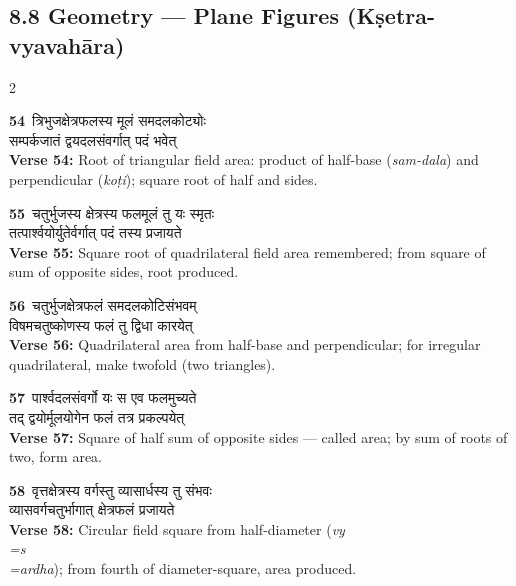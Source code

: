 \documentclass[11pt,a4paper]{article}
\newcommand{\dev}[1]{{\devanagarifont #1}}
\newcommand{\iast}[1]{\textit{#1}}
\newcommand{\vnum}[1]{\textcolor{versenumbercolor}{\textbf{#1}}}
\begin{document}
\subsection*{8.8 Geometry --- Plane Figures (K\d setra-vyavah\=ara)}
\label{sec:8.8}

\begin{center}
\end{center}

\begin{paracol}{2}

\switchcolumn[0]
\vnum{54}\ \dev{त्रिभुजक्षेत्रफलस्य मूलं समदलकोट्योः}\\
\dev{सम्पर्कजातं द्वयदलसंवर्गात् पदं भवेत्}\\
\switchcolumn[1]
\textbf{Verse 54:} Root of triangular field area: product of half-base (\iast{sam-dala}) and perpendicular (\iast{ko\d ti}); square root of half and sides.

\switchcolumn[0]
\vnum{55}\ \dev{चतुर्भुजस्य क्षेत्रस्य फलमूलं तु यः स्मृतः}\\
\dev{तत्पार्श्वयोर्युतेर्वर्गात् पदं तस्य प्रजायते}\\
\switchcolumn[1]
\textbf{Verse 55:} Square root of quadrilateral field area remembered; from square of sum of opposite sides, root produced.

\switchcolumn[0]
\vnum{56}\ \dev{चतुर्भुजक्षेत्रफलं समदलकोटिसंभवम्}\\
\dev{विषमचतुष्कोणस्य फलं तु द्विधा कारयेत्}\\
\switchcolumn[1]
\textbf{Verse 56:} Quadrilateral area from half-base and perpendicular; for irregular quadrilateral, make twofold (two triangles).

\switchcolumn[0]
\vnum{57}\ \dev{पार्श्वदलसंवर्गो यः स एव फलमुच्यते}\\
\dev{तद् द्वयोर्मूलयोगेन फलं तत्र प्रकल्पयेत्}\\
\switchcolumn[1]
\textbf{Verse 57:} Square of half sum of opposite sides --- called area; by sum of roots of two, form area.

\switchcolumn[0]
\vnum{58}\ \dev{वृत्तक्षेत्रस्य वर्गस्तु व्यासार्धस्य तु संभवः}\\
\dev{व्यासवर्गचतुर्भागात् क्षेत्रफलं प्रजायते}\\
\switchcolumn[1]
\textbf{Verse 58:} Circular field square from half-diameter (\iast{vy\\=s\\=ardha}); from fourth of diameter-square, area produced.


\end{paracol}
\end{document}
